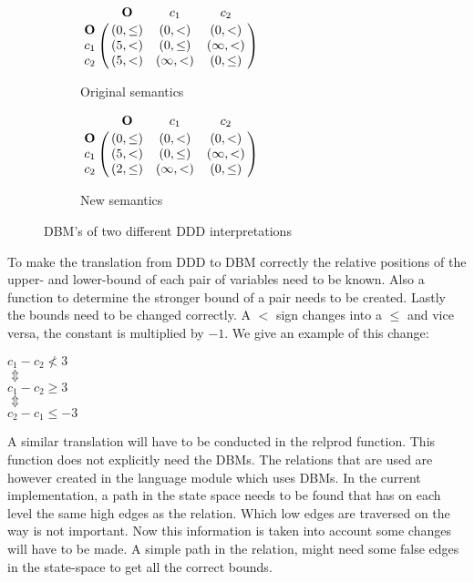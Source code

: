 \begin{figure}[h]
	\centering
	\begin{subfigure}[l]{.5\linewidth}
	\centering
	\begin{math}
    \bordermatrix{ 	   & \mathbf{O}   & c_1           & c_2          \cr
 			\mathbf{O} &(0,\leq)      & (0,<)      & (0,<)     \cr
 			c_1        &(5,<)      & (0,\leq)      & (\infty,<)\cr
 			c_2        &(5,<)      & (\infty,<) & (0,\leq)     \cr}
	\end{math}
	\caption{Original semantics}
	\label{fig:dbm-original}
	\end{subfigure}
	
		\begin{subfigure}[r]{.5\linewidth}
	\centering
	\begin{math}
    \bordermatrix{ 	   & \mathbf{O}   & c_1           & c_2          \cr
 			\mathbf{O} &(0,\leq)      & (0,<)      & (0,<)     \cr
 			c_1        &(5,<)      & (0,\leq)      & (\infty,<)\cr
 			c_2        &(2,\leq)      & (\infty,<) & (0,\leq)     \cr}
	\end{math}
	\caption{New semantics}
	\label{fig:dbm-new}
	\end{subfigure}
\caption{DBM's of two different DDD interpretations}
\label{fig:dbm-versions}
\end{figure}

To make the translation from DDD to DBM correctly the relative positions of the upper- and lower-bound of each pair of variables need to be known. Also a function to determine the stronger bound of a pair needs to be created. Lastly the bounds need to be changed correctly. A $<$ sign changes into a $\leq$ and vice versa, the constant is multiplied by $-1$. We give an example of this change:
\begin{center}
$c_1 - c_2 \nless 3$\\
$\Updownarrow$\\
$c_1 - c_2 \geq 3$\\
$\Updownarrow$\\
$c_2 - c_1 \leq -3$
\end{center}

A similar translation will have to be conducted in the relprod function. This function does not explicitly need the DBMs. The relations that are used are however created in the language module which uses DBMs. In the current implementation, a path in the state space needs to be found that has on each level the same high edges as the relation. Which low edges are traversed on the way is not important. Now this information is taken into account some changes will have to be made. A simple path in the relation, might need some false edges in the state-space to get all the correct bounds.

